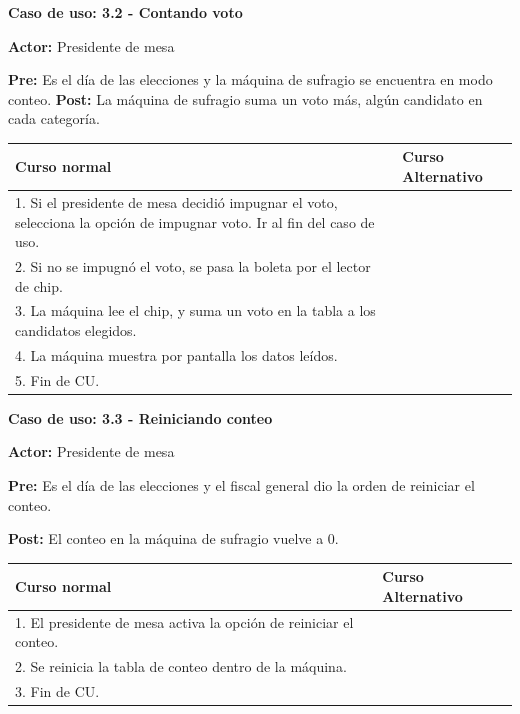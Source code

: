 \textbf{Caso de uso: 3.2 - Contando voto}

\textbf{Actor:} Presidente de mesa

\textbf{Pre:} Es el día de las elecciones y la máquina de sufragio se encuentra en modo conteo.
\textbf{Post:} La máquina de sufragio suma un voto más, algún candidato en cada categoría.
\begin{table}[h!]
	
 \begin{tabular}{|p{7.5cm} | p{7.5cm}|} 
 \hline
 \textbf{Curso normal} & \textbf{Curso Alternativo} \\
 \hline


1. Si el presidente de mesa decidió impugnar el voto, selecciona la opción de impugnar voto. Ir al fin del caso de uso. & \\

\hline

2. Si no se impugnó el voto, se pasa la boleta por el lector de chip. & \\

\hline


3. La máquina lee el chip, y suma un voto en la tabla a los candidatos elegidos. & \\

\hline

4. La máquina muestra por pantalla los datos leídos. & \\

\hline

5. Fin de CU. & \\
\hline
\end{tabular}
\end{table}


\textbf{Caso de uso: 3.3 - Reiniciando conteo}

\textbf{Actor:} Presidente de mesa

\textbf{Pre:} Es el día de las elecciones y el fiscal general dio la orden de reiniciar el conteo.

\textbf{Post:} El conteo en la máquina de sufragio vuelve a 0.

\begin{table}[h!]
	
 \begin{tabular}{|p{7.5cm} | p{7.5cm}|} 
 \hline
 \textbf{Curso normal} & \textbf{Curso Alternativo} \\
 \hline


1. El presidente de mesa activa la opción de reiniciar el conteo. & \\
\hline

2. Se reinicia la tabla de conteo dentro de la máquina. & \\
\hline


3. Fin de CU. & \\
\hline
\end{tabular}
\end{table}


